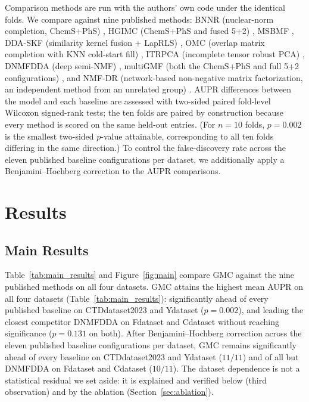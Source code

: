 \documentclass[webpdf,modern,large]{oup-authoring-template}
\begin{document}
Comparison methods are run with the authors' own code under the identical folds. We compare against nine published methods: BNNR (nuclear-norm completion, ChemS+PhS) \citep{yang2019}, HGIMC (ChemS+PhS and fused 5+2) \citep{yang2021hgimc}, MSBMF \citep{yang2020msbmf}, DDA-SKF (similarity kernel fusion + LapRLS) \citep{gao2022ddaskf}, OMC (overlap matrix completion with KNN cold-start fill) \citep{yang2019omc2}, ITRPCA (incomplete tensor robust PCA) \citep{yang2023itrpc}, DNMFDDA (deep semi-NMF) \citep{yang2025dnmf}, multiGMF (both the ChemS+PhS and full 5+2 configurations) \citep{yang2026multigmf}, and NMF-DR (network-based non-negative matrix factorization, an independent method from an unrelated group) \citep{sadeghi2022}. AUPR differences between the model and each baseline are assessed with two-sided paired fold-level Wilcoxon signed-rank tests; the ten folds are paired by construction because every method is scored on the same held-out entries. (For $n=10$ folds, $p=0.002$ is the smallest two-sided $p$-value attainable, corresponding to all ten folds differing in the same direction.) To control the false-discovery rate across the eleven published baseline configurations per dataset, we additionally apply a Benjamini--Hochberg correction to the AUPR comparisons.

\section{Results}
\label{sec:results}

\subsection{Main Results}

Table~\ref{tab:main_results} and Figure~\ref{fig:main} compare GMC against the nine published methods on all four datasets. GMC attains the highest mean AUPR on all four datasets (Table~\ref{tab:main_results}): significantly ahead of every published baseline on CTDdataset2023 and Ydataset ($p=0.002$), and leading the closest competitor DNMFDDA on Fdataset and Cdataset without reaching significance ($p=0.131$ on both). After Benjamini--Hochberg correction across the eleven published baseline configurations per dataset, GMC remains significantly ahead of every baseline on CTDdataset2023 and Ydataset ($11/11$) and of all but DNMFDDA on Fdataset and Cdataset ($10/11$). The dataset dependence is not a statistical residual we set aside: it is explained and verified below (third observation) and by the ablation (Section~\ref{sec:ablation}).
\end{document}
